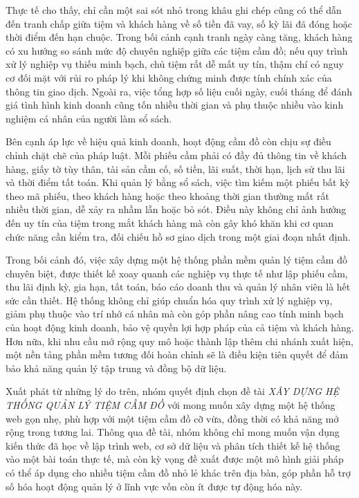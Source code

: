 \documentclass[13pt,a4paper]{extreport}
\newcommand{\TenDeTai}{XÂY DỰNG HỆ THỐNG QUẢN LÝ TIỆM CẦM ĐỒ}
\begin{document}
Thực tế cho thấy, chỉ cần một sai sót nhỏ trong khâu ghi chép cũng có thể dẫn đến tranh chấp giữa tiệm và khách hàng về số tiền đã vay, số kỳ lãi đã đóng hoặc thời điểm đến hạn chuộc. Trong bối cảnh cạnh tranh ngày càng tăng, khách hàng có xu hướng so sánh mức độ chuyên nghiệp giữa các tiệm cầm đồ; nếu quy trình xử lý nghiệp vụ thiếu minh bạch, chủ tiệm rất dễ mất uy tín, thậm chí có nguy cơ đối mặt với rủi ro pháp lý khi không chứng minh được tính chính xác của thông tin giao dịch. Ngoài ra, việc tổng hợp số liệu cuối ngày, cuối tháng để đánh giá tình hình kinh doanh cũng tốn nhiều thời gian và phụ thuộc nhiều vào kinh nghiệm cá nhân của người làm sổ sách.

Bên cạnh áp lực về hiệu quả kinh doanh, hoạt động cầm đồ còn chịu sự điều chỉnh chặt chẽ của pháp luật. Mỗi phiếu cầm phải có đầy đủ thông tin về khách hàng, giấy tờ tùy thân, tài sản cầm cố, số tiền, lãi suất, thời hạn, lịch sử thu lãi và thời điểm tất toán. Khi quản lý bằng sổ sách, việc tìm kiếm một phiếu bất kỳ theo mã phiếu, theo khách hàng hoặc theo khoảng thời gian thường mất rất nhiều thời gian, dễ xảy ra nhầm lẫn hoặc bỏ sót. Điều này không chỉ ảnh hưởng đến uy tín của tiệm trong mắt khách hàng mà còn gây khó khăn khi cơ quan chức năng cần kiểm tra, đối chiếu hồ sơ giao dịch trong một giai đoạn nhất định.

Trong bối cảnh đó, việc xây dựng một hệ thống phần mềm quản lý tiệm cầm đồ chuyên biệt, được thiết kế xoay quanh các nghiệp vụ thực tế như lập phiếu cầm, thu lãi định kỳ, gia hạn, tất toán, báo cáo doanh thu và quản lý nhân viên là hết sức cần thiết. Hệ thống không chỉ giúp chuẩn hóa quy trình xử lý nghiệp vụ, giảm phụ thuộc vào trí nhớ cá nhân mà còn góp phần nâng cao tính minh bạch của hoạt động kinh doanh, bảo vệ quyền lợi hợp pháp của cả tiệm và khách hàng. Hơn nữa, khi nhu cầu mở rộng quy mô hoặc thành lập thêm chi nhánh xuất hiện, một nền tảng phần mềm tương đối hoàn chỉnh sẽ là điều kiện tiên quyết để đảm bảo khả năng quản lý tập trung và đồng bộ dữ liệu.

Xuất phát từ những lý do trên, nhóm quyết định chọn đề tài \emph{\TenDeTai} với mong muốn xây dựng một hệ thống web gọn nhẹ, phù hợp với một tiệm cầm đồ cỡ vừa, đồng thời có khả năng mở rộng trong tương lai. Thông qua đề tài, nhóm không chỉ mong muốn vận dụng kiến thức đã học về lập trình web, cơ sở dữ liệu và phân tích thiết kế hệ thống vào một bài toán thực tế, mà còn kỳ vọng đề xuất được một mô hình giải pháp có thể áp dụng cho nhiều tiệm cầm đồ nhỏ lẻ khác trên địa bàn, góp phần hỗ trợ số hóa hoạt động quản lý ở lĩnh vực vốn còn ít được tự động hóa này.
\end{document}
